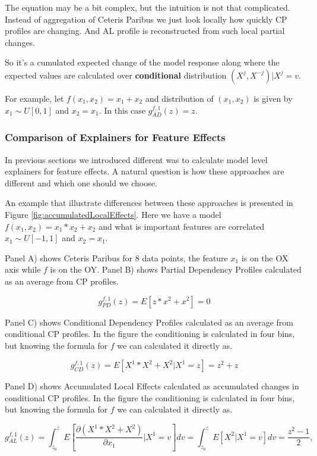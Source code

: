 \documentclass[12pt,]{krantz}
\begin{document}
The equation may be a bit complex, but the intuition is not that complicated. Instead of aggregation of Ceteris Paribus we just look locally how quickly CP profiles are changing. And AL profile is reconstructed from such local partial changes.

So it's a cumulated expected change of the model response along where the expected values are calculated over \textbf{conditional} distribution \((X^j,X^{-j})|X^j=v\).

For example, let \(f(x_1, x_2) = x_1 + x_2\) and distribution of \((x_1, x_2)\) is given by \(x_1 \sim U[0,1]\) and \(x_2=x_1\). In this case \(g_{AD}^{f, 1}(z) = z\).

\hypertarget{summaryFeatureEffects}{%
\subsubsection{Comparison of Explainers for Feature Effects}\label{summaryFeatureEffects}}

In previous sections we introduced different was to calculate model level explainers for feature effects.
A natural question is how these approaches are different and which one should we choose.

An example that illustrate differences between these approaches is presented in Figure \ref{fig:accumulatedLocalEffects}.
Here we have a model \(f(x_1, x_2) = x_1*x_2 + x_2\) and what is important features are correlated \(x_1 \sim U[-1,1]\) and \(x_2 = x_1\).

Panel A) shows Ceteris Paribus for 8 data points, the feature \(x_1\) is on the OX axis while \(f\) is on the OY.
Panel B) shows Partial Dependency Profiles calculated as an average from CP profiles.

\[
g_{PD}^{f,1}(z) = E[z*x^2 + x^2] = 0
\]

Panel C) shows Conditional Dependency Profiles calculated as an average from conditional CP profiles. In the figure the conditioning is calculated in four bins, but knowing the formula for \(f\) we can calculated it directly as.

\[
g_{CD}^{f,1}(z) = E[X^1*X^2 + X^2 | X^1 = z] = z^2+z
\]

Panel D) shows Accumulated Local Effects calculated as accumulated changes in conditional CP profiles. In the figure the conditioning is calculated in four bins, but knowing the formula for \(f\) we can calculated it directly as.

\[
g_{AL}^{f,1}(z) = \int_{z_0}^z E\left[\frac{\partial (X^1*X^2 + X^2)}{\partial x_1}|X^1 = v\right] dv  = \int_{z_0}^z E\left[X^2|X^1 = v\right] dv  = \frac{z^2 -1 }{2},
\]
\end{document}
